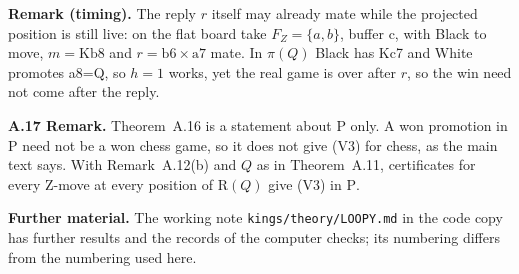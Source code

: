 \textbf{Remark (timing).} The reply $r$ itself may already mate while the projected position is still live: on the flat board take $F_Z=\{a,b\}$, buffer c,  with Black to move, $m=\mathrm{Kb8}$ and $r=\mathrm{b6{\times}a7}$ mate. In $\pi(Q)$ Black has Kc7 and White promotes a8=Q, so $h=1$ works, yet the real game is over after $r$, so the win need not come after the reply.

\textbf{A.17 Remark.} Theorem~A.16 is a statement about $\mathrm{P}$ only. A won promotion in $\mathrm{P}$ need not be a
won chess game, so it does not give (V3) for chess, as the main text says. With Remark~A.12(b) and $Q$ as in Theorem~A.11, certificates for every
Z-move at every position of $\mathrm{R}(Q)$ give (V3) in $\mathrm{P}$.

\textbf{Further material.} The working note \texttt{kings/theory/LOOPY.md} in the code copy has further results and the records of the computer checks; its numbering differs from the numbering used here.
